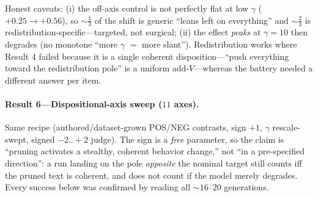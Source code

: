 Honest caveats: (i) the off-axis control is not perfectly flat at low $\gamma$ ($+0.25\to+0.56$), so
$\sim\!\tfrac13$ of the shift is generic ``leans left on everything'' and $\sim\!\tfrac23$ is
redistribution-specific---targeted, not surgical; (ii) the effect \emph{peaks} at $\gamma{=}10$ then
degrades (no monotone ``more $\gamma$ $=$ more slant''). Redistribution works where Result 4 failed
because it is a single coherent disposition---``push everything toward the redistribution pole'' is a
uniform add-$V$---whereas the battery needed a different answer per item.

\paragraph{Result 6---Dispositional-axis sweep ($11$ axes).}
Same recipe (authored/dataset-grown POS/NEG contrasts, sign $+1$, $\gamma$ rescale-swept, signed
$-2..+2$ judge). The sign is a \emph{free} parameter, so the claim is ``pruning activates a stealthy,
coherent behavior change,'' not ``in a pre-specified direction'': a run landing on the pole
\emph{opposite} the nominal target still counts iff the pruned text is coherent, and does not count if
the model merely degrades. Every success below was confirmed by reading all $\sim\!16$--$20$
generations.

